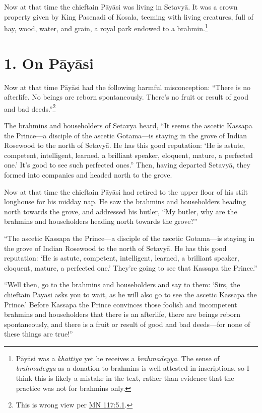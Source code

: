 \documentclass[12pt,openany]{book}%
\begin{document}
Now at that time the chieftain \textsanskrit{Pāyāsi} was living in \textsanskrit{Setavyā}. It was a crown property given by King Pasenadi of Kosala, teeming with living creatures, full of hay, wood, water, and grain, a royal park endowed to a brahmin.\footnote{\textsanskrit{Pāyāsi}  was a \textit{khattiya} yet he receives a \textit{brahmadeyya}. The sense of \textit{brahmadeyya} as a donation to brahmins is well attested in inscriptions, so I think this is likely a mistake in the text, rather than evidence that the practice was not for brahmins only. } 

\section*{1. On \textsanskrit{Pāyāsi} }

Now at that time \textsanskrit{Pāyāsi} had the following harmful misconception: “There is no afterlife. No beings are reborn spontaneously. There’s no fruit or result of good and bad deeds.”\footnote{This is wrong view per \href{https://suttacentral.net/mn117/en/sujato\#5.1}{MN 117:5.1}. } 

The brahmins and householders of \textsanskrit{Setavyā} heard, “It seems the ascetic Kassapa the Prince—a disciple of the ascetic Gotama—is staying in the grove of Indian Rosewood to the north of \textsanskrit{Setavyā}. He has this good reputation: ‘He is astute, competent, intelligent, learned, a brilliant speaker, eloquent, mature, a perfected one.’ It’s good to see such perfected ones.” Then, having departed \textsanskrit{Setavyā}, they formed into companies and headed north to the grove. 

Now at that time the chieftain \textsanskrit{Pāyāsi} had retired to the upper floor of his stilt longhouse for his midday nap. He saw the brahmins and householders heading north towards the grove, and addressed his butler, “My butler, why are the brahmins and householders heading north towards the grove?” 

“The ascetic Kassapa the Prince—a disciple of the ascetic Gotama—is staying in the grove of Indian Rosewood to the north of \textsanskrit{Setavyā}. He has this good reputation: ‘He is astute, competent, intelligent, learned, a brilliant speaker, eloquent, mature, a perfected one.’ They’re going to see that Kassapa the Prince.” 

“Well then, go to the brahmins and householders and say to them: ‘Sirs, the chieftain \textsanskrit{Pāyāsi} asks you to wait, as he will also go to see the ascetic Kassapa the Prince.’ Before Kassapa the Prince convinces those foolish and incompetent brahmins and householders that there is an afterlife, there are beings reborn spontaneously, and there is a fruit or result of good and bad deeds—for none of these things are true!” 
\end{document}

